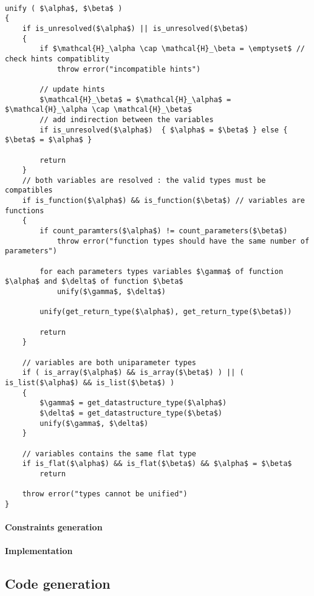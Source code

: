 \documentclass[a4paper,11pt]{article}
\begin{document}
\begin{center}
\begin{minipage}{0.75\linewidth}
\begin{lstlisting}[mathescape,caption={Unification algorithm},label={lst:unification}]

unify ( $\alpha$, $\beta$ )
{
	if is_unresolved($\alpha$) || is_unresolved($\beta$)
	{
		if $\mathcal{H}_\alpha \cap \mathcal{H}_\beta = \emptyset$ // check hints compatiblity
			throw error("incompatible hints")

	 	// update hints
	 	$\mathcal{H}_\beta$ = $\mathcal{H}_\alpha$ = $\mathcal{H}_\alpha \cap \mathcal{H}_\beta$
		// add indirection between the variables
		if is_unresolved($\alpha$)	{ $\alpha$ = $\beta$ } else { $\beta$ = $\alpha$ }

		return
	}
	// both variables are resolved : the valid types must be compatibles
	if is_function($\alpha$) && is_function($\beta$) // variables are functions
	{
		if count_paramters($\alpha$) != count_parameters($\beta$)
			throw error("function types should have the same number of parameters")

		for each parameters types variables $\gamma$ of function $\alpha$ and $\delta$ of function $\beta$
			unify($\gamma$, $\delta$)

		unify(get_return_type($\alpha$), get_return_type($\beta$))

		return
	}

	// variables are both uniparameter types
	if ( is_array($\alpha$) && is_array($\beta$) ) || ( is_list($\alpha$) && is_list($\beta$) )
	{
		$\gamma$ = get_datastructure_type($\alpha$)
		$\delta$ = get_datastructure_type($\beta$)
		unify($\gamma$, $\delta$)
	}

	// variables contains the same flat type
	if is_flat($\alpha$) && is_flat($\beta$) && $\alpha$ = $\beta$
		return

	throw error("types cannot be unified")
}
\end{lstlisting}
\end{minipage}
\end{center}
\paragraph{Constraints generation}
\paragraph{Implementation}

\subsection{Code generation}
\end{document}
